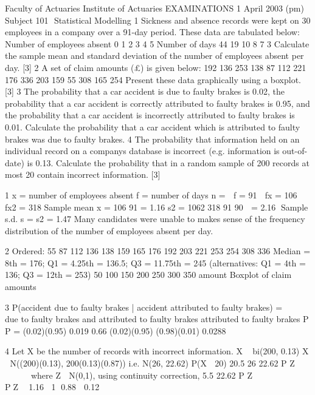 Faculty of Actuaries Institute of Actuaries
EXAMINATIONS
1 April 2003 (pm)
Subject 101  Statistical Modelling
1 Sickness and absence records were kept on 30 employees in a company over a 91-day
period. These data are tabulated below:
Number of employees absent 0 1 2 3 4 5
Number of days 44 19 10 8 7 3
Calculate the sample mean and standard deviation of the number of employees absent
per day. [3]
2 A set of claim amounts (£) is given below:
192 136 253 138 87
112 221 176 336 203
159 55 308 165 254
Present these data graphically using a boxplot. [3]
3 The probability that a car accident is due to faulty brakes is 0.02, the probability that a
car accident is correctly attributed to faulty brakes is 0.95, and the probability that a
car accident is incorrectly attributed to faulty brakes is 0.01.
Calculate the probability that a car accident which is attributed to faulty brakes was
due to faulty brakes. 
4 The probability that information held on an individual record on a companys
database is incorrect (e.g. information is out-of-date) is 0.13.
Calculate the probability that in a random sample of 200 records at most 20 contain
incorrect information. [3]



1 x = number of employees absent
f = number of days
n =  f = 91  fx = 106  fx2 = 318
Sample mean x = 106
91
= 1.16
s2 =
1062 318
91
90

= 2.16  Sample s.d. s = s2 = 1.47
Many candidates were unable to makes sense of the frequency distribution of the number of employees
absent per day.

2 Ordered: 55 87 112 136 138 159 165 176 192 203 221 253 254 308 336
Median = 8th = 176; Q1 = 4.25th = 136.5; Q3 = 11.75th = 245
(alternatives: Q1 = 4th = 136; Q3 = 12th = 253)
50 100 150 200 250 300 350
amount
Boxplot of claim amounts

3 P(accident due to faulty brakes | accident attributed to faulty brakes)
=  
 
due to faulty brakes and attributed to faulty brakes
attributed to faulty brakes
P
P
= (0.02)(0.95) 0.019 0.66
(0.02)(0.95) (0.98)(0.01) 0.0288
 


4 Let X be the number of records with incorrect information.
X ~ bi(200, 0.13)
X  N((200)(0.13), 200(0.13)(0.87))
i.e. N(26, 22.62)
P(X  20)
20.5 26
22.62
P Z
  
   
 	
where Z  N(0,1), using continuity correction,
5.5
22.62
P Z
  
   
 	
 PZ  1.16 1 0.88  0.12
